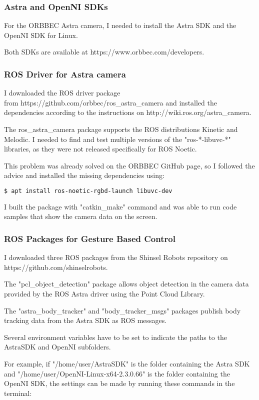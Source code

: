 \subsubsection{Astra and OpenNI SDKs}
For the ORBBEC Astra camera, I needed to install the Astra SDK and the OpenNI SDK for Linux.\par
Both SDKs are available at https://www.orbbec.com/developers.\par

\subsubsection{ROS Driver for Astra camera}
I downloaded the ROS driver package\\
from https://github.com/orbbec/ros\_astra\_camera and installed the dependencies according to the instructions on http://wiki.ros.org/astra\_camera.\par
The ros\_astra\_camera package supports the ROS distributions Kinetic and Melodic. I needed to find and test multiple versions of the "ros-*-libuvc-*" libraries, as they were not released specifically for ROS Noetic.\par
This problem was already solved on the ORBBEC GitHub page, so I followed the advice and installed the missing dependencies using:\par

\begin{lstlisting}[language=bash]
  $ apt install ros-noetic-rgbd-launch libuvc-dev
\end{lstlisting}


I built the package with "catkin\_make" command and was able to run code samples that show the camera data on the screen.\par

\subsubsection{ROS Packages for Gesture Based Control}
I downloaded three ROS packages from the Shinsel Robots repository on https://github.com/shinselrobots.\par
The "pcl\_object\_detection" package allows object detection in the camera data provided by the ROS Astra driver using the Point Cloud Library.\par
The "astra\_body\_tracker" and "body\_tracker\_msgs" packages publish body tracking data from the Astra SDK as ROS messages.\par
Several environment variables have to be set to indicate the paths to the AstraSDK and OpenNI subfolders.\par
For example, if "/home/user/AstraSDK" is the folder containing the Astra SDK and "/home/user/OpenNI-Linux-x64-2.3.0.66" is the folder containing the OpenNI SDK, the settings can be made by running these commands in the terminal: \par

